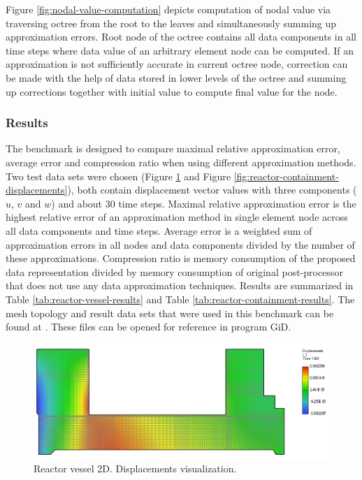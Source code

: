 Figure \ref{fig:nodal-value-computation} depicts computation of nodal value via traversing octree from the root to the leaves and simultaneously summing up approximation errors. Root node of the octree contains all data components in all time steps where data value of an arbitrary element node can be computed. If an approximation is not sufficiently accurate in current octree node, correction can be made with the help of data stored in lower levels of the octree and summing up corrections together with initial value to compute final value for the node.


\subsubsection{Results}

The benchmark is designed to compare maximal relative approximation error, average error and compression ratio when using different approximation methods. Two test data sets were chosen (Figure \ref{fig:reactor-vessel-displacements} and Figure \ref{fig:reactor-containment-displacements}), both contain displacement vector values with three components ($u$, $v$ and $w$) and about 30 time steps. Maximal relative approximation error is the highest relative error of an approximation method in single element node across all data components and time steps. Average error is a weighted sum of approximation errors in all nodes and data components divided by the number of these approximations. Compression ratio is memory consumption of the proposed data representation divided by memory consumption of original post-processor that does not use any data approximation techniques. Results are summarized in Table \ref{tab:reactor-vessel-results} and Table \ref{tab:reactor-containment-results}. The mesh topology and result data sets that were used in this benchmark can be found at \cite{XXX-15}.  These files can be opened for reference in program GiD.

\begin{figure}[H]
\centering
\includegraphics[width=\textwidth]{figures/appendix-approximation/figure7}
\decoRule
\caption[Reactor vessel 2D]{Reactor vessel 2D. Displacements visualization.}
\label{fig:reactor-vessel-displacements}
\end{figure}

